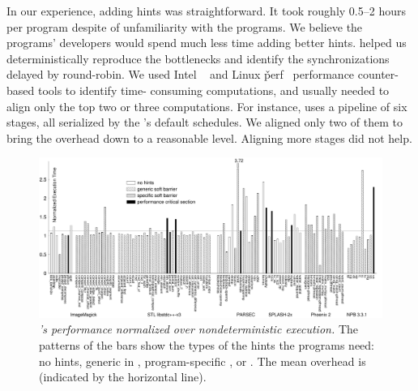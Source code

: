In our experience, adding hints was straightforward.  It took roughly 0.5--2 
hours per program despite of unfamiliarity with the programs.  We believe
the programs' developers would spend much less time adding better hints.
\parrot helped us deterministically reproduce the bottlenecks and identify
the synchronizations delayed by round-robin.  We used Intel \vtune~\cite{vtune} and
Linux \v{perf}~\cite{perf} performance counter-based tools to identify time-
consuming computations, and usually needed to align only the top two or three
computations.  For instance, \ferret uses a pipeline of six stages, all
serialized by the \parrot's default schedules.  We aligned only two of them to 
bring the overhead down to a reasonable level.  Aligning more stages did not help.




\begin{figure}[tb]
\includegraphics[width=0.6\columnwidth]{parrot/figures/overhead}
\caption{{\em \parrot's performance normalized over nondeterministic
    execution.}  The patterns of the bars show the types of the hints the 
programs
  need: no hints, generic \computes in \libgomp, program-specific
  \computes, or \nondets.  The mean overhead is
  \meanoverhead (indicated by the horizontal line).} \label{fig:overhead}
\vspace{-.05in}
\end{figure}





